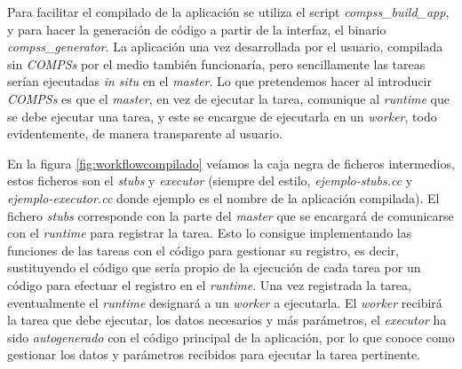 \par\bigskip
Para facilitar el compilado de la aplicación se utiliza el script \textit{compss\_build\_app}, y para hacer la generación de código a partir de la interfaz, el binario \textit{compss\_generator}.
La aplicación una vez desarrollada por el usuario, compilada sin \textit{COMPSs} por el medio también funcionaría, pero sencillamente las tareas serían ejecutadas \textit{in situ} en el \textit{master}.  Lo que pretendemos hacer al introducir \textit{COMPSs} es que el \textit{master}, en vez de ejecutar la tarea, comunique al \textit{runtime} que se debe ejecutar una tarea, y este se encargue de ejecutarla en un \textit{worker}, todo evidentemente, de manera transparente al usuario.
\par\bigskip

\bigskip
En la figura \ref{fig:workflowcompilado} veíamos la caja negra de ficheros intermedios, estos ficheros son el \textit{stubs} y \textit{executor} (siempre del estilo, \textit{ejemplo-stubs.cc} y \textit{ejemplo-executor.cc} donde ejemplo es el nombre de la aplicación compilada). El fichero \textit{stubs} corresponde con la parte del \textit{master} que se encargará de comunicarse con el \textit{runtime} para registrar la tarea. Esto lo consigue implementando las funciones de las tareas con el código para gestionar su registro, es decir, sustituyendo el código que sería propio de la ejecución de cada tarea por un código para efectuar el registro en el \textit{runtime}. Una vez registrada la tarea, eventualmente el \textit{runtime} designará a un \textit{worker} a ejecutarla. El \textit{worker} recibirá la tarea que debe ejecutar, los datos necesarios y más parámetros, el \textit{executor} ha sido \textit{autogenerado} con el código principal de la aplicación, por lo que conoce como gestionar los datos y parámetros recibidos para ejecutar la tarea pertinente. 

